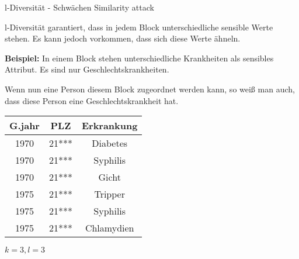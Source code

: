 \begin{frame}{l-Diversität - Schwächen}
	\large \textcolor{gray!80}{Similarity attack} \normalsize \small\cite{Li2007t-closseness} 
	\vspace{0.2cm}

	l-Diversität garantiert, dass in jedem Block unterschiedliche sensible Werte stehen. Es kann jedoch vorkommen, dass sich diese Werte ähneln.

	\vspace{0.2cm}

	\textbf{Beispiel:} In einem Block stehen unterschiedliche Krankheiten als sensibles Attribut. Es sind nur Geschlechtskrankheiten.
	
	Wenn nun eine Person diesem Block zugeordnet werden kann, so weiß man auch, dass diese Person eine Geschlechtskrankheit hat.

	\vspace{0.2cm}
	\centering
	\begin{tabular}{|c|c|c|}
	\hline \textbf{G.jahr} & \textbf{PLZ} & \textbf{Erkrankung} \\
	\hline
     1970 & 21*** & Diabetes \\ 
	 1970 & 21*** & Syphilis \\ 
	 1970 & 21*** & Gicht \\
	\hline 
     1975 & 21*** & \cellcolor{svsrot}Tripper \\
     1975 & 21*** & \cellcolor{svsrot}Syphilis \\ 
	 1975 & 21*** & \cellcolor{svsrot}Chlamydien \\ 
	\hline 
	\end{tabular}

	\vspace{0.2cm}
	\(k = 3, l = 3\)
\end{frame}

